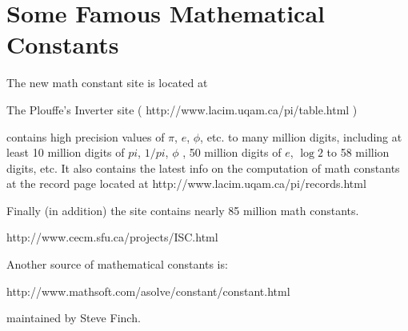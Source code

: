 \section{Some Famous Mathematical Constants}
The new math constant site is located at


The Plouffe's Inverter site 
( http://www.lacim.uqam.ca/pi/table.html )

contains high precision values of
$\pi$, $e$, $\phi$, etc.  to many million digits,
including at least 10 million digits of $pi$,
$1/pi$, $\phi$ , 50 million digits of $e$, $\log 2$ to 58 million
digits, etc. It also contains the latest info on the computation
of math constants at the record page located at
http://www.lacim.uqam.ca/pi/records.html

Finally (in addition) the site contains nearly 85 million math
constants.



http://www.cecm.sfu.ca/projects/ISC.html


Another source of mathematical constants is:

http://www.mathsoft.com/asolve/constant/constant.html

maintained by Steve Finch.


